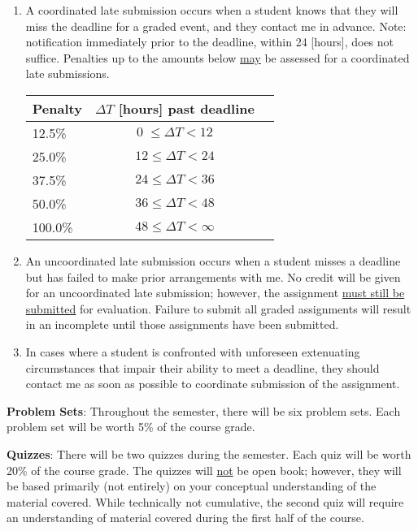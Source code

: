 \begin{enumerate}
\item{
A coordinated late submission occurs when a student knows that they will miss the deadline for a graded event, and they contact me in advance. 
Note: notification immediately prior to the deadline, within 24 [hours], does not suffice.  
Penalties up to the amounts below \underline{may} be assessed for a coordinated late submissions.

{
\begin{center}
\setlength{\extrarowheight}{2.0pt}

\begin{tabular}{lcc}
Penalty & $\Delta T$ [hours] past deadline\\ \hline
12.5\%  & $0\;  \leq \Delta T < 12$ \\ 
25.0\%  & $12 \leq \Delta T < 24$\\
37.5\%  & $24 \leq \Delta T < 36$\\
50.0\%  & $36 \leq \Delta T < 48$\\
100.0\% & $48 \leq \Delta T < \infty$
\end{tabular}
\end{center}
}

} 

\item{An uncoordinated late submission occurs when a student misses a deadline but has failed to make prior arrangements with me. No credit will be given for an uncoordinated late submission; however, the assignment \underline{must still be submitted} for evaluation. Failure to submit all graded assignments will result in an incomplete until those assignments have been submitted.
}
\item{In cases where a student is confronted with unforeseen extenuating circumstances that impair their ability to meet a deadline, they should contact me as soon as possible to coordinate submission of the assignment.
}
\end{enumerate}

\textbf{Problem Sets}:
Throughout the semester, there will be six problem sets. Each problem set will be worth 5\% of the course grade.

\textbf{Quizzes}:
There will be two quizzes during the semester. Each quiz will be worth 20\% of the course grade. The quizzes will \underline{not} be open book; however, they will be based primarily (not entirely) on your conceptual understanding of the material covered. While technically not cumulative, the second quiz will require an understanding of material covered during the first half of the course.

